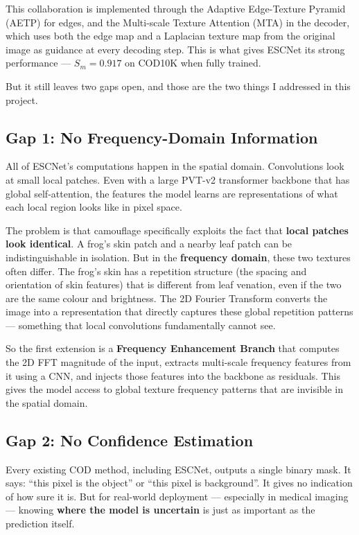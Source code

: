 \documentclass[12pt,a4paper]{report}
\begin{document}
This collaboration is implemented through the Adaptive Edge-Texture Pyramid (AETP) for edges, and the Multi-scale Texture Attention (MTA) in the decoder, which uses both the edge map and a Laplacian texture map from the original image as guidance at every decoding step. This is what gives ESCNet its strong performance — $S_m = 0.917$ on COD10K when fully trained.

But it still leaves two gaps open, and those are the two things I addressed in this project.

\subsection*{Gap 1: No Frequency-Domain Information}

All of ESCNet's computations happen in the spatial domain. Convolutions look at small local patches. Even with a large PVT-v2 transformer backbone that has global self-attention, the features the model learns are representations of what each local region looks like in pixel space.

The problem is that camouflage specifically exploits the fact that \textbf{local patches look identical}. A frog's skin patch and a nearby leaf patch can be indistinguishable in isolation. But in the \textbf{frequency domain}, these two textures often differ. The frog's skin has a repetition structure (the spacing and orientation of skin features) that is different from leaf venation, even if the two are the same colour and brightness. The 2D Fourier Transform converts the image into a representation that directly captures these global repetition patterns — something that local convolutions fundamentally cannot see.

So the first extension is a \textbf{Frequency Enhancement Branch} that computes the 2D FFT magnitude of the input, extracts multi-scale frequency features from it using a CNN, and injects those features into the backbone as residuals. This gives the model access to global texture frequency patterns that are invisible in the spatial domain.

\subsection*{Gap 2: No Confidence Estimation}

Every existing COD method, including ESCNet, outputs a single binary mask. It says: ``this pixel is the object'' or ``this pixel is background''. It gives no indication of how sure it is. But for real-world deployment — especially in medical imaging — knowing \textbf{where the model is uncertain} is just as important as the prediction itself.
\end{document}
